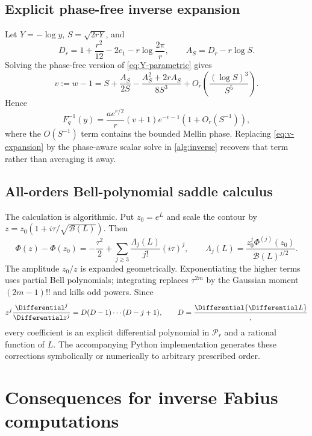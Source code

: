 \documentclass[11pt,oneside]{article}
\theoremstyle{definition}
\theoremstyle{remark}
\newcommand{\cP}{\mathcal P}
\newcommand{\cB}{\mathcal B}
\begin{document}
\subsection{Explicit phase-free inverse expansion}

Let $Y=-\log y$, $S=\sqrt{2rY}$, and
\begin{equation}
 D_r=1+\frac{r^2}{12}-2c_1-r\log\frac{2\pi}{r},
 \qquad A_S=D_r-r\log S.
 \label{eq:Dr-AS}
\end{equation}
Solving the phase-free version of \eqref{eq:Y-parametric} gives
\begin{equation}
 v:=w-1
 =S+\frac{A_S}{2S}
 -\frac{A_S^2+2rA_S}{8S^3}
 +O_r\!\left(\frac{(\log S)^3}{S^5}\right).
 \label{eq:v-expansion}
\end{equation}
Hence
\begin{equation}
 F_q^{-1}(y)=
 \frac{ae^{r/2}}r(v+1)e^{-v-1}
 \left(1+O_r(S^{-1})\right),
 \label{eq:inverse-explicit}
\end{equation}
where the $O(S^{-1})$ term contains the bounded Mellin phase.  Replacing
\eqref{eq:v-expansion} by the phase-aware scalar solve in \cref{alg:inverse} recovers
that term rather than averaging it away.

\subsection{All-orders Bell-polynomial saddle calculus}

The calculation is algorithmic.  Put $z_0=e^L$ and scale the contour by
$z=z_0(1+i\tau/\sqrt{\cB(L)})$.  Then
\[
 \Phi(z)-\Phi(z_0)=-\frac{\tau^2}{2}
 +\sum_{j\ge3}\frac{\Lambda_j(L)}{j!}(i\tau)^j,
 \qquad
 \Lambda_j(L)=\frac{z_0^j\Phi^{(j)}(z_0)}{\cB(L)^{j/2}}.
\]
The amplitude $z_0/z$ is expanded geometrically.  Exponentiating the higher terms uses
partial Bell polynomials; integrating replaces $\tau^{2m}$ by the Gaussian moment
$(2m-1)!!$ and kills odd powers.  Since
\[
 z^j\frac{\Differential^j}{\Differential z^j}
 =D(D-1)\cdots(D-j+1),\qquad D=\frac\Differential{\Differential L},
\]
every coefficient is an explicit differential polynomial in $\cP_r$ and a rational
function of $L$.  The accompanying Python implementation generates these corrections
symbolically or numerically to arbitrary prescribed order.

\section{Consequences for inverse Fabius computations}
\label{sec:inverse-consequences}
\end{document}
